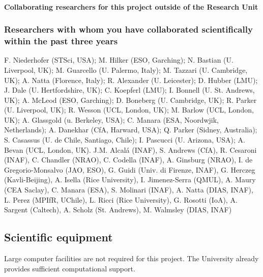 \documentclass[10pt,fleqn,twoside]{article}
\begin{document}
\paragraph{Collaborating researchers for this project outside of
  the Research Unit}


\subsubsection{Researchers with whom you have collaborated scientifically within the past three years}

F. Niederhofer (STSci, USA); M. Hilker (ESO, Garching); N. Bastian (U. Liverpool,
UK); M. Guarcello (U. Palermo, Italy); M. Tazzari (U. Cambridge, UK);
A. Natta (Florence, Italy); R. Alexander (U. Leicester); D. Hubber
(LMU); J. Dale (U. Hertfordshire, UK); C. Koepferl (LMU); I. Bonnell
(U. St. Andrews, UK); A. McLeod (ESO, Garching); D. Boneberg
(U. Cambridge, UK); R. Parker (U. Liverpool, UK); R. Wesson (UCL,
London, UK); M. Barlow (UCL, London, UK); A. Glassgold (u. Berkeley,
USA); C. Manara (ESA, Noordwjik, Netherlands); A. Danekhar (CfA,
Harward, USA); Q. Parker (Sidney, Australia); S. Casassus
(U. de Chile, Santiago, Chile); I. Pascucci (U. Arizona, USA);
A. Bevan (UCL, London, UK).
J.M. Alcal\'a (INAF), S. Andrews (CfA), R. Cesaroni (INAF),
C. Chandler (NRAO), C. Codella (INAF), A. Ginsburg (NRAO), I. de
Gregorio-Monsalvo (JAO, ESO), G. Guidi (Univ. di Firenze, INAF),
G. Herczeg (Kavli-Beijing), A. Isella (Rice University),
I. Jimenez-Serra (QMUL), A. Maury (CEA Saclay), C. Manara (ESA),
S. Molinari (INAF), A. Natta (DIAS, INAF), L. Perez (MPIfR, UChile),
L. Ricci (Rice University), G. Rosotti (IoA), A. Sargent (Caltech),
A. Scholz (St. Andrews), M. Walmsley (DIAS, INAF)

\subsection{Scientific equipment}

Large computer facilities are not required for this project. The
University already provides sufficient computational support. 
\end{document}
